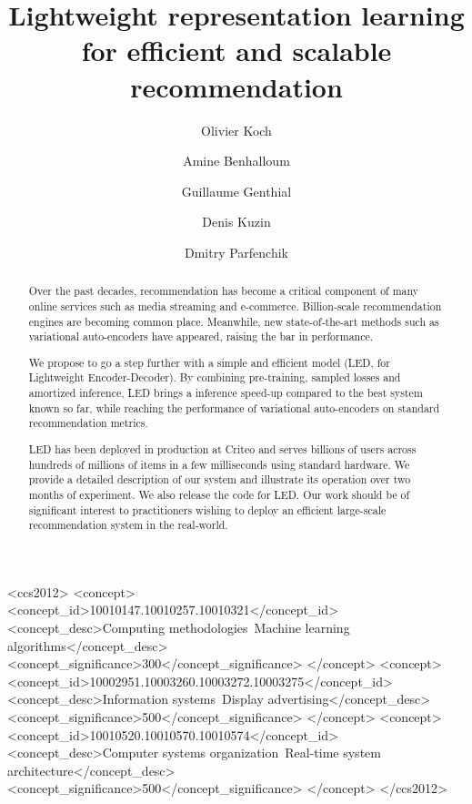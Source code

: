 \documentclass[sigconf]{acmart}
\begin{document}
\title{Lightweight representation learning for efficient and scalable recommendation}



\author{Olivier Koch}

\author{Amine Benhalloum}

\author{Guillaume Genthial}

\author{Denis Kuzin}
  
\author{Dmitry Parfenchik}

\renewcommand{\shortauthors}{}

\begin{abstract}

Over the past decades, recommendation has become a critical component of many online services such as media streaming and e-commerce. Billion-scale recommendation engines are becoming common place. Meanwhile, new state-of-the-art methods such as variational auto-encoders have appeared, raising the bar in performance. 


We propose to go a step further with a simple and efficient model (LED, for Lightweight Encoder-Decoder). By combining pre-training, sampled losses and amortized inference, LED brings a  inference speed-up compared to the best system known so far, while reaching the performance of variational auto-encoders on standard recommendation metrics.

LED has been deployed in production at Criteo and serves billions of users across hundreds of millions of items in a few milliseconds using standard hardware. We provide a detailed description of our system and illustrate its operation over two months of experiment. We also release the code for LED. Our work should be of significant interest to practitioners wishing to deploy an efficient large-scale recommendation system in the real-world.
\end{abstract}

\begin{CCSXML}
<ccs2012>
<concept>
<concept_id>10010147.10010257.10010321</concept_id>
<concept_desc>Computing methodologies~Machine learning algorithms</concept_desc>
<concept_significance>300</concept_significance>
</concept>
<concept>
<concept_id>10002951.10003260.10003272.10003275</concept_id>
<concept_desc>Information systems~Display advertising</concept_desc>
<concept_significance>500</concept_significance>
</concept>
<concept>
<concept_id>10010520.10010570.10010574</concept_id>
<concept_desc>Computer systems organization~Real-time system architecture</concept_desc>
<concept_significance>500</concept_significance>
</concept>
</ccs2012>
\end{CCSXML}
\end{document}
